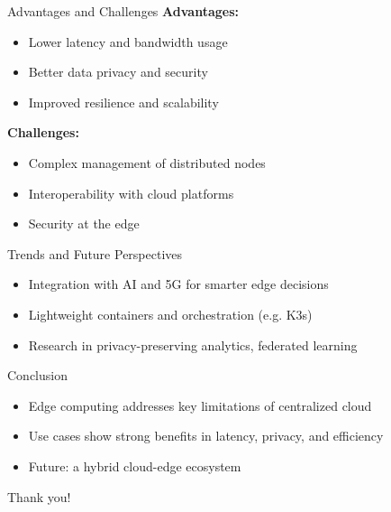 \documentclass{beamer}
\begin{document}
\begin{frame}{Advantages and Challenges}
  \textbf{Advantages:}
  \begin{itemize}
    \item Lower latency and bandwidth usage
    \item Better data privacy and security
    \item Improved resilience and scalability
  \end{itemize}
  \vspace{0.3cm}
  \textbf{Challenges:}
  \begin{itemize}
    \item Complex management of distributed nodes
    \item Interoperability with cloud platforms
    \item Security at the edge
  \end{itemize}
\end{frame}

\begin{frame}{Trends and Future Perspectives}
  \begin{itemize}
    \item Integration with AI and 5G for smarter edge decisions
    \item Lightweight containers and orchestration (e.g. K3s)
    \item Research in privacy-preserving analytics, federated learning
  \end{itemize}
\end{frame}

\begin{frame}{Conclusion}
    \begin{itemize}
      \item Edge computing addresses key limitations of centralized cloud
      \item Use cases show strong benefits in latency, privacy, and efficiency
      \item Future: a hybrid cloud-edge ecosystem
    \end{itemize}
    \vspace{0.3cm}
    Thank you!
  \end{frame}
\end{document}
